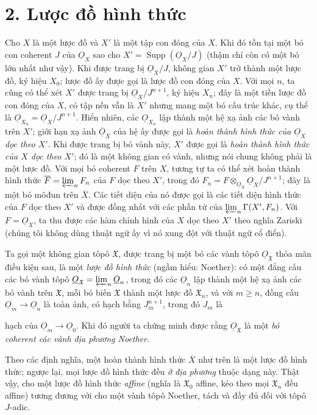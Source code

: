 \documentclass[11pt,twoside,openany]{book}
\numberwithin{equation}{section}
\newcommand{\src}[1]{%
  \phantomsection\hypertarget{src:\fgasourceid:#1}{}%
  \marginpar{\raggedleft\footnotesize\sffamily #1}%
}
\newcommand{\fgasourceid}{unset}
\newcommand{\Osh}{\underline{O}}
\newcommand{\fquote}[1]{\textquotedbl#1\textquotedbl}
\newcommand{\fsection}[2]{%
  \section*{#1. #2}%
  \addcontentsline{toc}{section}{#1. #2}%
}
\begin{document}
\fsection{2}{Lược đồ hình thức}

Cho $X$ là một lược đồ và $X'$ là một tập con đóng của $X$. Khi đó tồn tại một
bó con coherent $J$ của $\Osh_X$ sao cho
$X'=\operatorname{Supp}(\Osh_X/J)$ (thậm chí còn có một bó lớn nhất như vậy).
Khi được trang bị $\Osh_X/J$, không gian $X'$ trở thành một lược đồ, ký hiệu
$X_0$; lược đồ ấy được gọi là \fquote{lược đồ con đóng của $X$}. Với mọi $n$,
ta cũng có thể xét $X'$ được trang bị $\Osh_X/J^{n+1}$, ký hiệu $X_n$; đây là
một tiền lược đồ con đóng của $X$, có tập nền vẫn là $X'$ nhưng mang một bó
cấu trúc khác, cụ thể là $\Osh_{X_n}=\Osh_X/J^{n+1}$. Hiển nhiên, các
$\Osh_{X_n}$ lập thành một hệ xạ ảnh các bó vành trên $X'$; giới hạn xạ ảnh
$\overline{\Osh}_X$ của hệ ấy được gọi là \emph{hoàn thành hình thức của
$\Osh_X$ dọc theo $X'$}. Khi được trang bị bó vành này, $X'$ được gọi là
\emph{hoàn thành hình thức của $X$ dọc theo $X'$}; đó là một không gian có
vành, nhưng nói chung không phải là một lược đồ. Với mọi bó coherent $F$ trên
$X$, tương tự ta có thể xét hoàn thành hình thức
$\overline F=\varprojlim_n F_n$ của $F$ dọc theo $X'$, trong đó
$F_n=F\otimes_{\Osh_X}\Osh_X/J^{n+1}$; đây là một bó môđun trên
$\overline X$. Các tiết diện của nó được gọi là \fquote{các tiết diện hình
thức của $F$ dọc theo $X'$} và được đồng nhất với các phần tử của
$\varprojlim_n\Gamma(X',F_n)$. Với $F=\Osh_X$, ta thu được các
\fquote{hàm chỉnh hình} của $X$ dọc theo $X'$ theo nghĩa Zariski (chúng tôi
không dùng thuật ngữ ấy vì nó xung đột với thuật ngữ cổ điển).

Ta gọi một không gian tôpô $\mathfrak X$, được trang bị một bó các vành tôpô
$\Osh_{\mathfrak X}$ thỏa mãn điều kiện sau, là một \emph{lược đồ hình thức}
(ngầm hiểu: Noether): có một đẳng cấu các bó vành tôpô
$\Osh_{\mathfrak X}=\varprojlim_n\Osh_n$, trong đó các $\Osh_n$ lập thành một
hệ xạ ảnh các bó vành trên $\mathfrak X$, mỗi bó biến $\mathfrak X$ thành một
lược đồ $\mathfrak X_n$, và với $m\geq n$, đồng cấu
$\Osh_m\longrightarrow\Osh_n$ là toàn ánh, có hạch bằng $J_m^{n+1}$, trong đó
$J_m$ là

\src{196}
hạch của $\Osh_m\longrightarrow\Osh_0$. Khi đó người ta chứng minh được rằng
$\Osh_{\mathfrak X}$ là một \emph{bó coherent các vành địa phương Noether}.

Theo các định nghĩa, một hoàn thành hình thức $\overline X$ như trên là một
lược đồ hình thức; ngược lại, mọi lược đồ hình thức đều \emph{ở địa phương}
thuộc dạng này. Thật vậy, cho một lược đồ hình thức \emph{affine} (nghĩa là
$\mathfrak X_0$ affine, kéo theo mọi $\mathfrak X_n$ đều affine) tương đương
với cho một vành tôpô Noether, tách và đầy đủ đối với tôpô $J$-adic.
\end{document}
